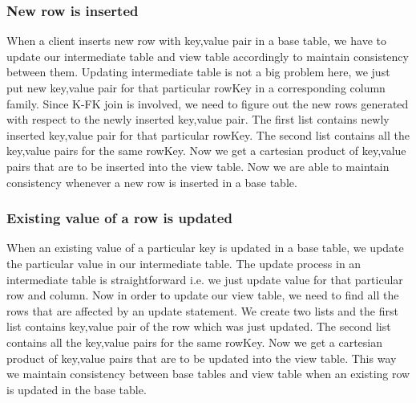 \documentclass[11pt,a4paper,bibtotoc,idxtotoc,headsepline,footsepline,footexclude,BCOR12mm,DIV13]{scrbook}
\begin{document}
\subsubsection{New row is inserted}
\label{New row is inserted JoinSelection}
When a client inserts new row with key,value pair in a base table, we have to update our intermediate table and view table accordingly to maintain consistency between them. Updating intermediate table is not a big problem here, we just put new key,value pair for that particular rowKey in a corresponding column family. Since K-FK join is involved, we need to figure out the new rows generated with respect to the newly inserted key,value pair. The first list contains newly inserted key,value pair for that particular rowKey. The second list contains all the key,value pairs for the same rowKey. Now we get a cartesian product of key,value pairs that are to be inserted into the view table. Now we are able to maintain consistency whenever a new row is inserted in a base table.

\subsubsection{Existing value of a row is updated} 
When an existing value of a particular key is updated in a base table, we update the particular value in our intermediate table. The update process in an intermediate table is straightforward i.e. we just update value for that particular row and column. Now in order to update our view table, we need to find all the rows that are affected by an update statement. We create two lists and the first list contains key,value pair of the row which was just updated. The second list contains all the key,value pairs for the same rowKey. Now we get a cartesian product of key,value pairs that are to be updated into the view table. This way we maintain consistency between base tables and view table when an existing row is updated in the base table.
\end{document}
